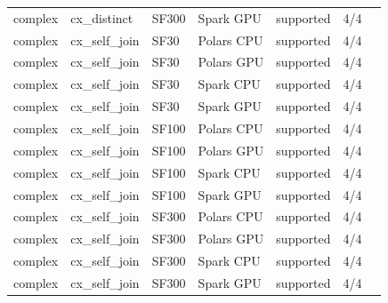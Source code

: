 \begin{longtable}{lllllll}
complex & cx\_distinct & SF300 & Spark GPU & supported & 4/4 &  \\
complex & cx\_self\_join & SF30 & Polars CPU & supported & 4/4 &  \\
complex & cx\_self\_join & SF30 & Polars GPU & supported & 4/4 &  \\
complex & cx\_self\_join & SF30 & Spark CPU & supported & 4/4 &  \\
complex & cx\_self\_join & SF30 & Spark GPU & supported & 4/4 &  \\
complex & cx\_self\_join & SF100 & Polars CPU & supported & 4/4 &  \\
complex & cx\_self\_join & SF100 & Polars GPU & supported & 4/4 &  \\
complex & cx\_self\_join & SF100 & Spark CPU & supported & 4/4 &  \\
complex & cx\_self\_join & SF100 & Spark GPU & supported & 4/4 &  \\
complex & cx\_self\_join & SF300 & Polars CPU & supported & 4/4 &  \\
complex & cx\_self\_join & SF300 & Polars GPU & supported & 4/4 &  \\
complex & cx\_self\_join & SF300 & Spark CPU & supported & 4/4 &  \\
complex & cx\_self\_join & SF300 & Spark GPU & supported & 4/4 &  \\
\end{longtable}

